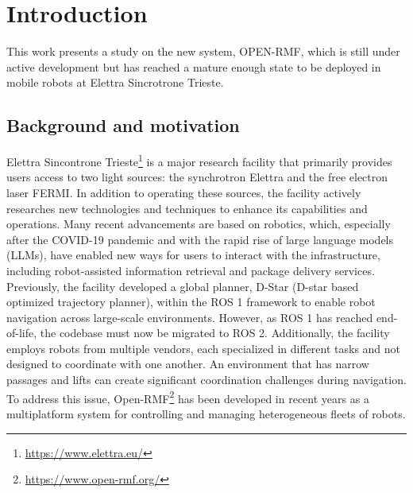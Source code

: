 \part{Introduction}
This work presents a study on the new system, OPEN-RMF, which is still under active development but has reached a mature enough state to be deployed in mobile robots at Elettra Sincrotrone Trieste.
\chapter{Background and motivation}
Elettra Sincontrone Trieste\footnote{\href{https://www.elettra.eu/}{https://www.elettra.eu/}} is a major research facility that primarily provides users access to two light sources: the synchrotron Elettra and the free electron laser FERMI.
In addition to operating these sources, the facility actively researches new technologies and techniques to enhance its capabilities and operations. Many recent advancements are based on robotics, which, especially after the COVID-19 pandemic and with the rapid rise of large language models (LLMs), have enabled new ways for users to interact with the infrastructure, including robot-assisted information retrieval and package delivery services.
Previously, the facility developed a global planner, D-Star (D-star based optimized trajectory planner)\cite{10.1007/978-3-031-45770-8_29}, within the ROS 1 framework to enable robot navigation across large-scale environments.  However, as ROS 1 has reached end-of-life, the codebase must now be migrated to ROS 2.
Additionally, the facility employs robots from multiple vendors, each specialized in different tasks and not designed to coordinate with one another.
An environment that has narrow passages and lifts can create significant coordination challenges during navigation.
To address this issue,  Open-RMF\footnote{\href{https://www.open-rmf.org/}{https://www.open-rmf.org/}} has been developed in recent years as a multiplatform system for controlling and managing heterogeneous fleets of robots.
